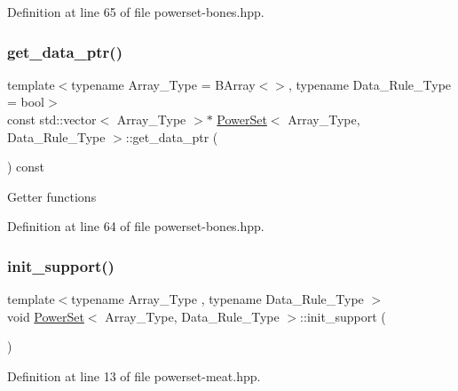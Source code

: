 Definition at line 65 of file powerset-\/bones.\+hpp.

\mbox{\label{class_power_set_a99cf1aa56e63a16c023bf7057b0b9288}} 
\subsubsection{\texorpdfstring{get\+\_\+data\+\_\+ptr()}{get\_data\_ptr()}}
{\footnotesize\ttfamily template$<$typename Array\+\_\+\+Type  = B\+Array$<$$>$, typename Data\+\_\+\+Rule\+\_\+\+Type  = bool$>$ \\
const std\+::vector$<$ Array\+\_\+\+Type $>$$\ast$ \hyperlink{class_power_set}{Power\+Set}$<$ Array\+\_\+\+Type, Data\+\_\+\+Rule\+\_\+\+Type $>$\+::get\+\_\+data\+\_\+ptr (\begin{DoxyParamCaption}{ }\end{DoxyParamCaption}) const\hspace{0.3cm}{\ttfamily [inline]}}

Getter functions 

Definition at line 64 of file powerset-\/bones.\+hpp.

\mbox{\label{class_power_set_a8eefc9606c6339938a8d9adcd0d7e153}} 
\subsubsection{\texorpdfstring{init\+\_\+support()}{init\_support()}}
{\footnotesize\ttfamily template$<$typename Array\+\_\+\+Type , typename Data\+\_\+\+Rule\+\_\+\+Type $>$ \\
void \hyperlink{class_power_set}{Power\+Set}$<$ Array\+\_\+\+Type, Data\+\_\+\+Rule\+\_\+\+Type $>$\+::init\+\_\+support (\begin{DoxyParamCaption}{ }\end{DoxyParamCaption})\hspace{0.3cm}{\ttfamily [inline]}}



Definition at line 13 of file powerset-\/meat.\+hpp.

\mbox{\label{class_power_set_aba11dd8802cd2eb529c7c30b55994248}} 
